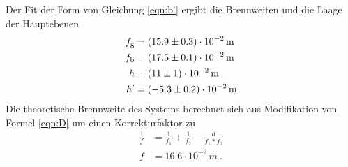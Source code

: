 Der Fit der Form von Gleichung \eqref{eqn:b'} ergibt die Brennweiten und die Laage der Hauptebenen
\begin{eqnarray}
  f_\text{g} &= (\num{ 15.9 +- 0.3}) \cdot 10^{-2} \, \text{m} \\ 
  f_\text{b} &= (\num{ 17.5 +- 0.1 }) \cdot 10^{-2} \, \text{m} \\
  h &= (\num{ 11 +- 1}) \cdot 10^{-2} \, \text{m} \\
  h' &= (\num{ -5.3 +- 0.2}) \cdot 10^{-2} \,\text{m} 
  \label{eqn:abbedf}
\end{eqnarray}
Die theoretische Brennweite des Systems berechnet sich aus Modifikation von Formel \eqref{eqn:D} um einen Korrekturfaktor zu 
\begin{eqnarray}
  \frac{1}{f} &= \frac{1}{f_1} + \frac{1}{f_2} - \frac{d}{f_1 * f_2} \\
  f &= 16.6 \cdot 10^{-2} \, m \ .
  \label{tabbe}
\end{eqnarray}

